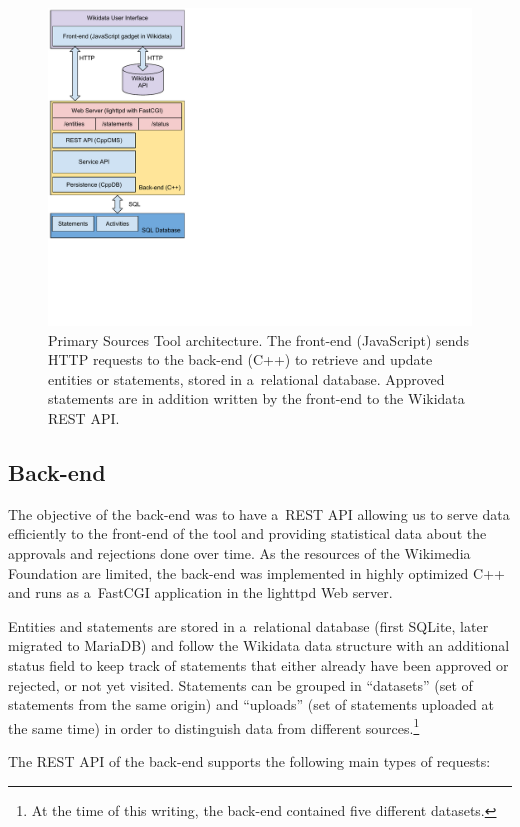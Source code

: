 \documentclass{sig-alternate-2013}
\begin{document}
\begin{figure}[!htbp]
    \centering
    \includegraphics[width=.65\columnwidth]{img/architecture.pdf}
    \caption{Primary Sources Tool architecture. The front-end (JavaScript) sends
      HTTP requests to the back-end (C++) to retrieve and update entities or
      statements, stored in a~relational database. Approved statements are in
      addition written by the front-end to the Wikidata REST API.}
    \label{fig:architecture}
\end{figure}

\subsection{Back-end}

The objective of the back-end was to have a~REST API allowing us
to serve data efficiently to the front-end of the tool and
providing statistical data about the approvals and rejections done over time.
As the resources of the Wikimedia Foundation are limited,
the back-end was implemented in highly optimized C++
and runs as a~FastCGI application in the lighttpd Web server.

Entities and statements are stored in a~relational database
(first SQLite, later migrated to MariaDB)
and follow the Wikidata data structure with an additional status field
to keep track of statements that either already have been approved or rejected,
or not yet visited.
Statements can be grouped in ``datasets'' (set of statements from the same origin)
and ``uploads'' (set of statements uploaded at the same time) in order to
distinguish data from different sources.\footnote{At the time of this writing,
the back-end contained five different datasets.}

The REST API of the back-end supports the following main types of requests:
\end{document}
